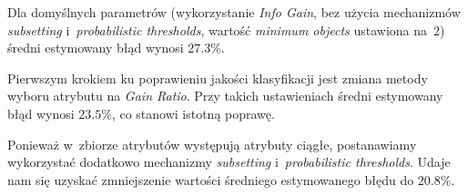 \begin{itemize}
Dla domyślnych parametrów (wykorzystanie \emph{Info Gain}, bez użycia mechanizmów \emph{subsetting} i~\emph{probabilistic thresholds}, wartość \emph{minimum objects} ustawiona na~2) średni estymowany błąd wynosi $27.3 \%$.

Pierwszym krokiem ku poprawieniu jakości klasyfikacji jest zmiana metody wyboru atrybutu na \emph{Gain Ratio}. Przy takich ustawieniach średni estymowany błąd wynosi $23.5 \%$, co stanowi istotną poprawę.

Ponieważ w~zbiorze atrybutów występują atrybuty ciągłe, postanawiamy wykorzystać dodatkowo mechanizmy \emph{subsetting} i~\emph{probabilistic thresholds}. Udaje nam się uzyskać zmniejszenie wartości średniego estymowanego błędu do $20.8 \%$.

\end{itemize}